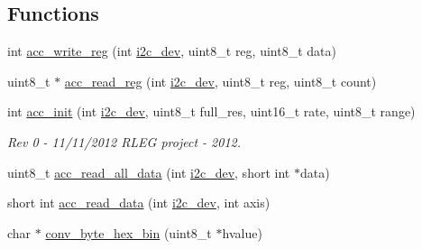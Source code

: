 \subsection*{Functions}
\begin{DoxyCompactItemize}
\item 
int \hyperlink{imu__functions_01_07C_xC3_xB3pia_01em_01conflito_01de_01Andr_xC3_xA9_01Carvalho_012013-04-26_08_8h_a534116416343122de29a5b6ade6876bd}{acc\-\_\-write\-\_\-reg} (int \hyperlink{CommunicationV0_2communication_8c_a7751bd45ac1064efb35adf1f19c25db8}{i2c\-\_\-dev}, uint8\-\_\-t reg, uint8\-\_\-t data)
\item 
uint8\-\_\-t $\ast$ \hyperlink{imu__functions_01_07C_xC3_xB3pia_01em_01conflito_01de_01Andr_xC3_xA9_01Carvalho_012013-04-26_08_8h_a2a91c44eebbe44f4d3b8c508633512f9}{acc\-\_\-read\-\_\-reg} (int \hyperlink{CommunicationV0_2communication_8c_a7751bd45ac1064efb35adf1f19c25db8}{i2c\-\_\-dev}, uint8\-\_\-t reg, uint8\-\_\-t count)
\item 
int \hyperlink{imu__functions_01_07C_xC3_xB3pia_01em_01conflito_01de_01Andr_xC3_xA9_01Carvalho_012013-04-26_08_8h_ae8f9cc6e0d15e61039d846305f86f073}{acc\-\_\-init} (int \hyperlink{CommunicationV0_2communication_8c_a7751bd45ac1064efb35adf1f19c25db8}{i2c\-\_\-dev}, uint8\-\_\-t full\-\_\-res, uint16\-\_\-t rate, uint8\-\_\-t range)
\begin{DoxyCompactList}\small\item\em Rev 0 -\/ 11/11/2012 R\-L\-E\-G project -\/ 2012. \end{DoxyCompactList}\item 
uint8\-\_\-t \hyperlink{imu__functions_01_07C_xC3_xB3pia_01em_01conflito_01de_01Andr_xC3_xA9_01Carvalho_012013-04-26_08_8h_a78334a746af1665a280d12195f48db02}{acc\-\_\-read\-\_\-all\-\_\-data} (int \hyperlink{CommunicationV0_2communication_8c_a7751bd45ac1064efb35adf1f19c25db8}{i2c\-\_\-dev}, short int $\ast$data)
\item 
short int \hyperlink{imu__functions_01_07C_xC3_xB3pia_01em_01conflito_01de_01Andr_xC3_xA9_01Carvalho_012013-04-26_08_8h_a041d6953f2bfc8c5efa4d5bbac812305}{acc\-\_\-read\-\_\-data} (int \hyperlink{CommunicationV0_2communication_8c_a7751bd45ac1064efb35adf1f19c25db8}{i2c\-\_\-dev}, int axis)
\item 
char $\ast$ \hyperlink{imu__functions_01_07C_xC3_xB3pia_01em_01conflito_01de_01Andr_xC3_xA9_01Carvalho_012013-04-26_08_8h_a1a6b2f719b4fef8f97d6d1b8f495148e}{conv\-\_\-byte\-\_\-hex\-\_\-bin} (uint8\-\_\-t $\ast$hvalue)
\item 

\end{DoxyCompactItemize}
